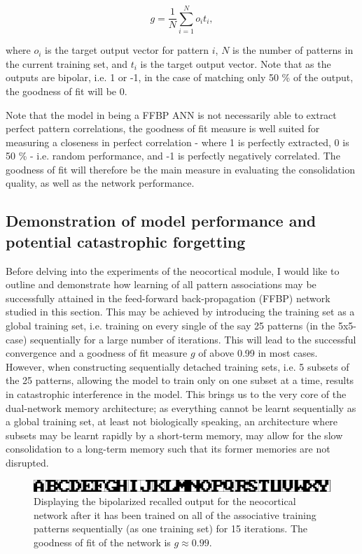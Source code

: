 \begin{equation}
    g = \frac{1}{N} \sum_{i=1}^{N}o_it_i,
\end{equation}

where $o_i$ is the target output vector for pattern $i$, $N$ is the number of patterns in the current training set, and $t_i$ is the target output vector. Note that as the outputs are bipolar, i.e. 1 or -1, in the case of matching only 50 \% of the output, the goodness of fit will be 0.

Note that the model in being a FFBP ANN is not necessarily able to extract perfect pattern correlations, the goodness of fit measure is well suited for measuring a closeness in perfect correlation - where 1 is perfectly extracted, 0 is 50 \% - i.e. random performance, and -1 is perfectly negatively correlated.
The goodness of fit will therefore be the main measure in evaluating the consolidation quality, as well as the network performance.

\subsection{Demonstration of model performance and potential catastrophic forgetting}

Before delving into the experiments of the neocortical module, I would like to outline and demonstrate how learning of all pattern associations may be successfully attained in the feed-forward back-propagation (FFBP) network studied in this section. This may be achieved by introducing the training set as a global training set, i.e. training on every single of the say 25 patterns (in the 5x5-case) sequentially for a large number of iterations. This will lead to the successful convergence and a goodness of fit measure $g$ of above 0.99 in most cases. However, when constructing sequentially detached training sets, i.e. 5 subsets of the 25 patterns, allowing the model to train only on one subset at a time, results in catastrophic interference in the model. This brings us to the very core of the dual-network memory architecture; as everything cannot be learnt sequentially as a global training set, at least not biologically speaking, an architecture where subsets may be learnt rapidly by a short-term memory, may allow for the slow consolidation to a long-term memory such that its former memories are not disrupted.

\begin{figure}
    \centering
    \includegraphics[width=12cm]{fig/neo-intro-demo/global_aggregate_im}
    \caption{Displaying the bipolarized recalled output for the neocortical network after it has been trained on all of the associative training patterns sequentially (as one training set) for 15 iterations. The goodness of fit of the network is $g\approx0.99$.}
    \label{fig:global_aggregate_im}
\end{figure}

